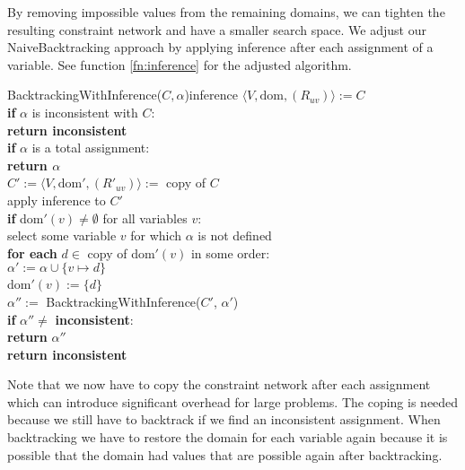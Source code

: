 By removing impossible values from the remaining domains, we can tighten the resulting constraint network and have a smaller search space. We adjust our NaiveBacktracking approach by applying inference after each assignment of a variable. See function \ref{fn:inference} for the adjusted algorithm.

\begin{function}{BacktrackingWithInference($C, \alpha$)}{inference}
	$\langle V, \text{dom}, (R_{uv})\rangle := C$ \\
	\textbf{if} $\alpha$ is inconsistent with $C$: \\
	\null \qquad\textbf{return inconsistent} \\

	\textbf{if} $\alpha$ is a total assignment: \\
	\null \qquad\textbf{return $\alpha$} \\

	$C' := \langle V, \text{dom}',(R'_{uv})\rangle :=$ copy of $C$ \\
	apply inference to $C'$ \\
	\textbf{if} dom$'(v) \neq \emptyset$ for all variables $v$: \\
	\null \qquad select some variable $v$ for which $\alpha$ is not defined \\
	\null \qquad \textbf{for each} $d \in$ copy of dom$'(v)$ in some order: \\
	\null \qquad \qquad $\alpha' := \alpha \cup \{v \mapsto d\}$ \\
	\null \qquad \qquad dom$'(v) := \{d\}$ \\
	\null \qquad \qquad $\alpha'' := $ BacktrackingWithInference($C'$, $\alpha'$) \\
	\null \qquad \qquad \textbf{if} $\alpha'' \neq$ \textbf{inconsistent}: \\
	\null \qquad \qquad \qquad \textbf{return} $\alpha''$ \\

	\textbf{return inconsistent}
\end{function}

Note that we now have to copy the constraint network after each assignment which can introduce significant overhead for large problems. The coping is needed because we still have to backtrack if we find an inconsistent assignment. When backtracking we have to restore the domain for each variable again because it is possible that the domain had values that are possible again after backtracking.

